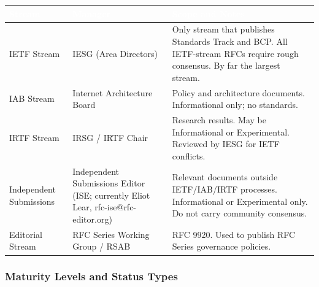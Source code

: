 \documentclass[11pt,letterpaper]{article}
\newcommand{\tableheader}[1]{\textbf{\sffamily\textcolor{white}{#1}}}
\begin{document}
\begin{center}
\begin{tabularx}{\textwidth}{L{3cm}L{3.5cm}X}
\toprule
{}
\tableheader{Stream} & \tableheader{Manager} & \tableheader{Scope and Notes} \\
\midrule
IETF Stream & IESG (Area Directors) & Only stream that publishes Standards Track and BCP. All IETF-stream RFCs require rough consensus. By far the largest stream. \\
IAB Stream & Internet Architecture Board & Policy and architecture documents. Informational only; no standards. \\
IRTF Stream & IRSG / IRTF Chair & Research results. May be Informational or Experimental. Reviewed by IESG for IETF conflicts. \\
Independent Submissions & Independent Submissions Editor (ISE; currently Eliot Lear, rfc-ise@rfc-editor.org) & Relevant documents outside IETF/IAB/IRTF processes. Informational or Experimental only. Do not carry community consensus. \\
Editorial Stream & RFC Series Working Group / RSAB & RFC 9920. Used to publish RFC Series governance policies. \\
\bottomrule
\end{tabularx}
\end{center}

\subsubsection{Maturity Levels and Status Types}
\end{document}
